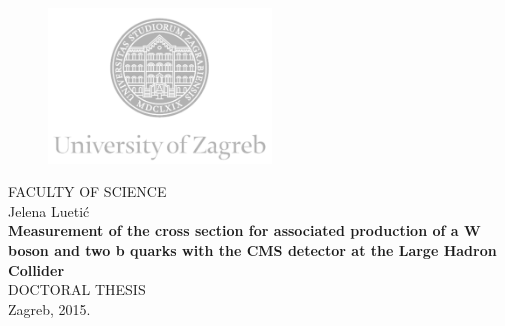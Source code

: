 \documentclass[12pt, twoside]{Thesis}
\begin{document}
\begin{titlepage}
  \fontsize{16pt}{20pt}\selectfont
  \selectfont
  \setlength{\intextsep}{0pt plus 0pt minus 0pt}

  \begin{center}
    \begin{figure}[ht!]
      \begin{center}
        \includegraphics[height=4.1184cm, width=5.94cm]{logo_unizg_eng}
      \end{center}
    \end{figure}
    \vspace{0cm}
    {FACULTY OF SCIENCE} \\
    \vspace{3cm}
    Jelena Luetić \\
    \vspace{2cm}
    {\fontsize{22pt}{22pt}\selectfont\textbf{Measurement of the cross section for associated production of a W boson and two b quarks with the CMS detector at the Large Hadron Collider}} \\
    \vspace{2cm}  
    DOCTORAL THESIS \\    
    \vfill{Zagreb, 2015.}
  \end{center}
\end{titlepage}
\end{document}
